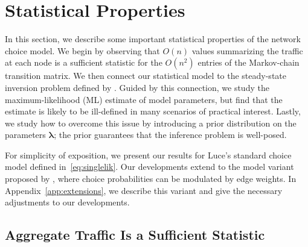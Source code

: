 \section{Statistical Properties}  %
\label{sec:theory}

In this section, we describe some important statistical properties of the network choice model.
We begin by observing that $O(n)$ values summarizing the traffic at each node is a sufficient statistic for the $O(n^2)$ entries of the Markov-chain transition matrix.
We then connect our statistical model to the steady-state inversion problem defined by \citet{kumar2015inverting}.
Guided by this connection, we study the maximum-likelihood (ML) estimate of model parameters, but find that the estimate is likely to be ill-defined in many scenarios of practical interest.
Lastly, we study how to overcome this issue by introducing a prior distribution on the parameters $\bm{\lambda}$; the prior guarantees that the inference problem is well-posed.

For simplicity of exposition, we present our results for Luce's standard choice model defined in~\eqref{eq:singlelik}.
Our developments extend to the model variant proposed by \citet{kumar2015inverting}, where choice probabilities can be modulated by edge weights.
In Appendix~\ref{app:extensions}, we describe this variant and give the necessary adjustments to our developments.

\subsection{Aggregate Traffic Is a Sufficient Statistic}


